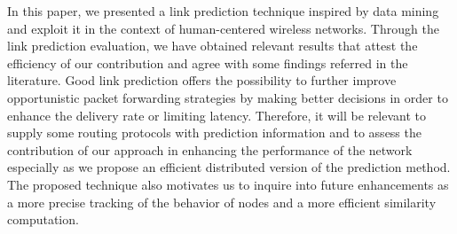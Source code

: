 \documentclass[conference]{IEEEtran}
\begin{document}
In this paper, we presented a link prediction technique inspired by
data mining and exploit it in the context of human-centered wireless
networks. Through the link prediction evaluation, we have obtained
relevant results that attest the efficiency of our contribution and
agree
with some findings referred in the literature. 
Good link prediction offers the possibility to further improve
opportunistic packet forwarding strategies by making better
decisions in order to enhance the delivery rate or limiting latency.
Therefore, it will be relevant to supply some routing protocols with
prediction information and to assess the contribution of our
approach in enhancing the performance of the network especially as
we propose an efficient distributed version of the prediction
method. The proposed technique also motivates us to inquire into
future enhancements as a more precise tracking of the behavior of
nodes and a more efficient similarity computation.




\end{document}
